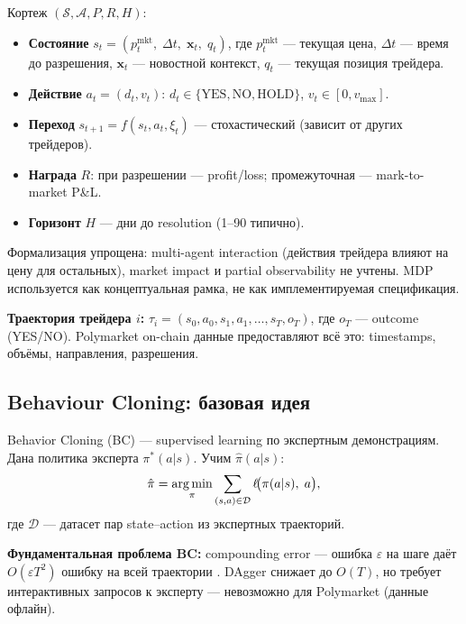 \begin{definition}
\label{def:mdp}
Кортеж $(\mathcal{S}, \mathcal{A}, P, R, H)$:
\begin{itemize}[nosep]
  \item \textbf{Состояние} $s_t = (p_t^{\mathrm{mkt}},\; \Delta t,\; \mathbf{x}_t,\; q_t)$,
    где $p_t^{\mathrm{mkt}}$ --- текущая цена, $\Delta t$ --- время до разрешения,
    $\mathbf{x}_t$ --- новостной контекст, $q_t$ --- текущая позиция трейдера.
  \item \textbf{Действие} $a_t = (d_t, v_t)$:
    $d_t \in \{\text{YES}, \text{NO}, \text{HOLD}\}$, $v_t \in [0, v_{\max}]$.
  \item \textbf{Переход} $s_{t+1} = f(s_t, a_t, \xi_t)$ --- стохастический (зависит от других трейдеров).
  \item \textbf{Награда} $R$: при разрешении --- profit/loss; промежуточная --- mark-to-market P\&L.
  \item \textbf{Горизонт} $H$ --- дни до resolution (1--90 типично).
\end{itemize}
\end{definition}

\begin{remark}
Формализация упрощена: multi-agent interaction (действия трейдера
влияют на цену для остальных), market impact и partial observability не учтены.
MDP используется как концептуальная рамка, не как имплементируемая спецификация.
\end{remark}

\textbf{Траектория трейдера $i$:}
$\tau_i = (s_0, a_0, s_1, a_1, \ldots, s_T, o_T)$, где $o_T$ --- outcome (YES/NO).
Polymarket on-chain данные предоставляют всё это: timestamps, объёмы, направления, разрешения.

\subsection{Behaviour Cloning: базовая идея}

Behavior Cloning (BC) --- supervised learning по экспертным демонстрациям.
Дана политика эксперта $\pi^*(a|s)$. Учим $\hat{\pi}(a|s)$:
\begin{equation}
\label{eq:bc}
\hat{\pi} = \operatorname*{arg\,min}_{\pi} \sum_{(s,a) \in \mathcal{D}} \ell\!\bigl(\pi(a|s),\; a\bigr),
\end{equation}
где $\mathcal{D}$ --- датасет пар state--action из экспертных траекторий.

\textbf{Фундаментальная проблема BC:}
compounding error --- ошибка $\varepsilon$ на шаге даёт $O(\varepsilon T^2)$ ошибку
на всей траектории \citep{ross2011reduction}.
DAgger \citep{ross2011reduction} снижает до $O(T)$, но требует
интерактивных запросов к эксперту --- невозможно для Polymarket (данные офлайн).

